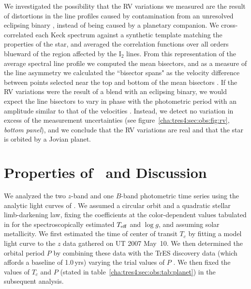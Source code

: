 We investigated the possibility that the RV variations we measured are the
result of distortions in the line profiles caused by contamination from an
unresolved eclipsing binary \citep{Santos_Mayor_Naef:aa:2002a, Torres_Konacki_Sasselov:apj:2005a}, instead of being caused by a planetary companion. We cross-correlated
each Keck spectrum against a synthetic template matching the properties of the
star, and averaged the correlation functions over all orders blueward of the
region affected by the I$_2$ lines. From this representation of the average
spectral line profile we computed the mean bisectors, and as a measure of the
line asymmetry we calculated the ``bisector spans" as the velocity difference
between points selected near the top and bottom of the mean bisectors
\citep{Torres_Konacki_Sasselov:apj:2005a}. If the RV variations were the result of a blend with an eclipsing
binary, we would expect the line bisectors to vary in phase with the
photometric period with an amplitude similar to that of the velocities
\citep{Queloz_Henry_Sivan:aa:2001a, Mandushev_Torres_Latham:apj:2005a}. Instead, we detect no variation in excess of the
measurement uncertainties (see figure~\ref{cha:tres4:sec:obs:fig:rv}, {\it bottom panel}), and we conclude
that the RV variations are real and that the star is orbited by a Jovian
planet.

\section{Properties of \tresFour\ and Discussion}
\label{cha:tres4:sec:dis}


We analyzed the two $z$-band and one $B$-band photometric time series using the
analytic light curves of \citet{Mandel_Agol:apjl:2002a}. We assumed a circular orbit and a
quadratic stellar limb-darkening law, fixing the coefficients at the
color-dependent values tabulated in \citet{Claret:aa:2000a, Claret:aa:2004a} for the
spectroscopically estimated $T_{\rm eff}$ and $\log g$, and assuming solar
metallicity. We first estimated the time of center of transit $T_c$ by fitting
a model light curve to the $z$ data gathered on UT 2007 May~10. We then determined the orbital period $P$ by combining these
data with the TrES discovery data (which affords a baseline of 1.0\,yrs)
varying the trial values of $P$
. We then fixed the values of $T_c$ and $P$
(stated in table~\ref{cha:tres4:sec:obs:tab:planet}) in the subsequent analysis.

